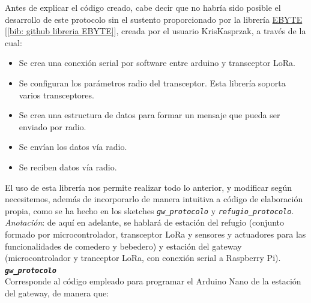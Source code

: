 \documentclass[12pt]{article}
\begin{document}
	\noindent Antes de explicar el código creado, cabe decir que no habría sido posible el desarrollo de este protocolo sin el sustento proporcionado por la librería \href{https://github.com/KrisKasprzak/EBYTE}{EBYTE} [\ref{bib: github libreria EBYTE}], creada por el usuario KrisKasprzak, a través de la cual:
	
	\begin{itemize}
		\item Se crea una conexión serial por software entre arduino y transceptor LoRa.
		\item Se configuran los parámetros radio del transceptor. Esta librería soporta varios transceptores.
		\item Se crea una estructura de datos para formar un mensaje que pueda ser enviado por radio.
		\item Se envían los datos vía radio.
		\item Se reciben datos vía radio.
	\end{itemize}
	
	\noindent El uso de esta librería nos permite realizar todo lo anterior, y modificar según necesitemos, además de incorporarlo de manera intuitiva a código de elaboración propia, como se ha hecho en los sketches \texttt{\textit{gw\_protocolo}} y \texttt{\textit{refugio\_protocolo}}. \\
	
	\noindent \textit{Anotación}: de aquí en adelante, se hablará de estación del refugio (conjunto formado por microcontrolador, transceptor LoRa y sensores y actuadores para las funcionalidades de comedero y bebedero) y estación del gateway (microcontrolador y tranceptor LoRa, con conexión serial a Raspberry Pi). \\
	
	\noindent \textbf{\texttt{\textit{gw\_protocolo}}} \\
	
	\noindent Corresponde al código empleado para programar el Arduino Nano de la estación del gateway, de manera que: 
	
\end{document}

